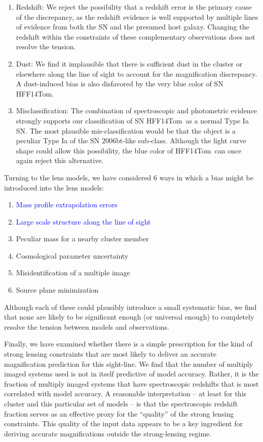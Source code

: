 \documentclass[iop]{emulateapj}
\newcommand{\change}[1]{{ \textcolor{blue}{#1}}}
\newcommand{\change}[1]{#1}
\def\tomas{HFF14Tom}
\begin{document}
\begin{enumerate}
\item Redshift: We reject the possibility that a redshift error is the primary cause
of the discrepancy, as the redshift evidence is well supported by
multiple lines of evidence from both the SN and the presumed host
galaxy. Changing the redshift within the constraints of these
complementary observations does not resolve the tension. 
\item Dust: We find
it implausible that there is sufficient dust in the cluster or
elsewhere along the line of sight to account for the magnification
discrepancy.  A dust-induced bias is also disfavored by the very blue
color of SN \tomas.
\item Misclassification: The combination of spectroscopic and
photometric evidence strongly supports our classification of
SN \tomas\ as a normal Type Ia SN.  The most plausible
mis-classification would be that the object is a peculiar Type Ia of
the SN 2006bt-like sub-class.  Although the light curve shape could
allow this possibility, the blue color of \tomas\ can once again
reject this alternative. 
\end{enumerate}

\noindent 

Turning to the lens models, we have considered 6 ways in which a bias
might be introduced into the lens models:

\begin{enumerate}
\item \change{Mass profile extrapolation errors}
\item \change{Large scale structure along the line of sight}
\item Peculiar mass for a nearby cluster member
\item Cosmological parameter uncertainty
\item Misidentification of a multiple image
\item Source plane minimization
\end{enumerate}

\noindent
Although each of these could plausibly introduce a small systematic
bias, we find that none are likely to be significant enough (or
universal enough) to completely resolve the tension between models and
observations.  

Finally, we have examined whether there is a simple prescription for
the kind of strong lensing constraints that are most likely to deliver
an accurate magnification prediction for this sight-line.  We find
that the number of multiply imaged systems used is not in itself
predictive of model accuracy.  Rather, it is the fraction of multiply
imaged systems that have spectroscopic redshifts that is most
correlated with model accuracy.  A reasonable interpretation -- at
least for this cluster and this particular set of models -- is that
the spectroscopic redshift fraction serves as an effective proxy for
the ``quality'' of the strong lensing constraints. This quality of the
input data appears to be a key ingredient for deriving accurate
magnifications outside the strong-lensing regime.
\end{document}
